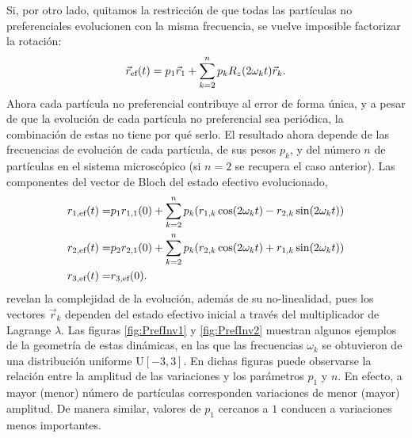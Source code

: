 Si, por otro lado, quitamos la restricción de que todas las partículas no preferenciales evolucionen con la misma frecuencia, se vuelve imposible factorizar la rotación:
\begin{equation}
    \vec{r}_{\text{ef}}(t)=p_{1}\vec{r}_{1}+\sum_{k=2}^{n} p_{k}R_{z}(2\omega_{k} t)\vec{r}_{k}.\nonumber
\end{equation}
Ahora cada partícula no preferencial contribuye al error de forma única, y a pesar de que la evolución de cada partícula no preferencial sea periódica, la combinación de estas no tiene por qué serlo. El resultado ahora depende de las frecuencias de evolución de cada partícula, de sus pesos $p_{k}$, y del número $n$ de partículas en el sistema microscópico (si $n=2$ se recupera el caso anterior). Las componentes del vector de Bloch del estado efectivo evolucionado,
\begin{align}
    r_{1,\text{ef}}(t)=&p_{1}r_{1,1}(0)+\sum_{k=2}^{n}p_{k}(r_{1,k}\cos(2\omega_{k} t)-r_{2,k}\sin(2\omega_{k} t))\nonumber\\
    r_{2,\text{ef}}(t)=&p_{2}r_{2,1}(0)+\sum_{k=2}^{n}p_{k}(r_{2,k}\cos(2\omega_{k} t)+r_{1,k}\sin(2\omega_{k} t))\nonumber\\
    r_{3,\text{ef}}(t)=&r_{3,\text{ef}}(0).\nonumber
\end{align}
revelan la complejidad de la evolución, además de su no-linealidad, pues los vectores $\vec{r}_{k}$ dependen del estado efectivo inicial a través del multiplicador de Lagrange $\lambda.$ Las figuras \ref{fig:PrefInv1} y \ref{fig:PrefInv2} muestran algunos ejemplos de la geometría de estas dinámicas, en las que las frecuencias $\omega_{k}$ se obtuvieron de una distribución uniforme $\text{U}[-3,3]$. En dichas figuras puede observarse la relación entre la amplitud de las variaciones y los parámetros $p_{1}$ y $n$. En efecto, a mayor (menor) número de partículas corresponden variaciones de menor (mayor) amplitud. De manera similar, valores de $p_{1}$ cercanos a $1$ conducen a variaciones menos importantes.


